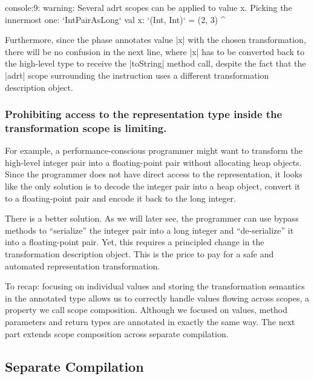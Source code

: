 \begin{lstlisting-nobreak}
console:9:  warning: Several adrt scopes can be applied to value x. Picking the innermost one: `IntPairAsLong`
val x: `(Int, Int)` = (2, 3)
          ^
\end{lstlisting-nobreak}

Furthermore, since the \inject{} phase annotates value |x| with the chosen transformation, there will be no confusion in the next line, where |x| has to be converted back to the high-level type to receive the |toString| method call, despite the fact that the |adrt| scope surrounding the instruction uses a different transformation description object.

\subsubsection{Prohibiting access to the representation type inside the transformation scope is limiting.} For example, a per\-for\-mance-conscious programmer might want to transform the high-level integer pair into a floating-point pair without allocating heap objects. Since the programmer does not have direct access to the representation, it looks like the only solution is to decode the integer pair into a heap object, convert it to a floating-point pair and encode it back to the long integer.

There is a better solution. As we will later see, the programmer can use bypass methods to ``serialize'' the integer pair into a long integer and ``de-serialize'' it into a floating-point pair. Yet, this requires a principled change in the transformation description object. This is the price to pay for a safe and automated representation transformation.

To recap: focusing on individual values and storing the transformation semantics in the annotated type allows us to correctly handle values flowing across scopes, a property we call scope composition. Although we focused on values, method parameters and return types
are annotated in exactly the same way. The next part extends scope composition across separate compilation.


\subsection{Separate Compilation}
\label{sec:ildl:separate-compilation}

